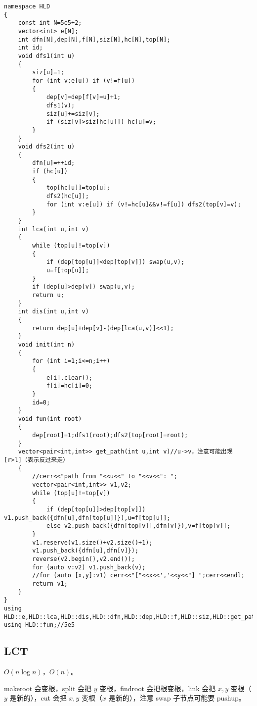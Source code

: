\documentclass{ctexart}
\begin{document}
\begin{lstlisting}
namespace HLD
{
	const int N=5e5+2;
	vector<int> e[N];
	int dfn[N],dep[N],f[N],siz[N],hc[N],top[N];
	int id;
	void dfs1(int u)
	{
		siz[u]=1;
		for (int v:e[u]) if (v!=f[u])
		{
			dep[v]=dep[f[v]=u]+1;
			dfs1(v);
			siz[u]+=siz[v];
			if (siz[v]>siz[hc[u]]) hc[u]=v;
		}
	}
	void dfs2(int u)
	{
		dfn[u]=++id;
		if (hc[u])
		{
			top[hc[u]]=top[u];
			dfs2(hc[u]);
			for (int v:e[u]) if (v!=hc[u]&&v!=f[u]) dfs2(top[v]=v);
		}
	}
	int lca(int u,int v)
	{
		while (top[u]!=top[v])
		{
			if (dep[top[u]]<dep[top[v]]) swap(u,v);
			u=f[top[u]];
		}
		if (dep[u]>dep[v]) swap(u,v);
		return u;
	}
	int dis(int u,int v)
	{
		return dep[u]+dep[v]-(dep[lca(u,v)]<<1);
	}
	void init(int n)
	{
		for (int i=1;i<=n;i++)
		{
			e[i].clear();
			f[i]=hc[i]=0;
		}
		id=0;
	}
	void fun(int root)
	{
		dep[root]=1;dfs1(root);dfs2(top[root]=root);
	}
	vector<pair<int,int>> get_path(int u,int v)//u->v，注意可能出现 [r>l]（表示反过来走）
	{
		//cerr<<"path from "<<u<<" to "<<v<<": ";
		vector<pair<int,int>> v1,v2;
		while (top[u]!=top[v])
		{
			if (dep[top[u]]>dep[top[v]]) v1.push_back({dfn[u],dfn[top[u]]}),u=f[top[u]];
			else v2.push_back({dfn[top[v]],dfn[v]}),v=f[top[v]];
		}
		v1.reserve(v1.size()+v2.size()+1);
		v1.push_back({dfn[u],dfn[v]});
		reverse(v2.begin(),v2.end());
		for (auto v:v2) v1.push_back(v);
		//for (auto [x,y]:v1) cerr<<"["<<x<<','<<y<<"] ";cerr<<endl;
		return v1;
	}
}
using HLD::e,HLD::lca,HLD::dis,HLD::dfn,HLD::dep,HLD::f,HLD::siz,HLD::get_path;
using HLD::fun;//5e5
\end{lstlisting}



\subsection{LCT}

$O(n\log n)$，$O(n)$。

makeroot 会变根，split 会把 $y$ 变根，findroot 会把根变根，link 会把 $x,y$ 变根（$y$ 是新的），cut 会把 $x,y$ 变根（$x$ 是新的），注意 swap 子节点可能要 pushup。
\end{document}
